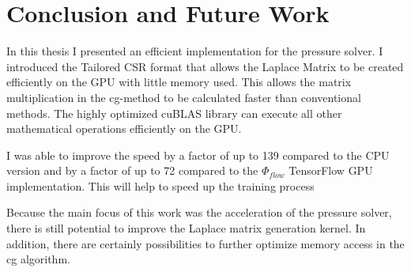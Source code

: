 
\chapter{Conclusion and Future Work}\label{chapter:conclusion}
In this thesis I presented an efficient implementation for the pressure solver. I introduced the Tailored CSR format that allows the Laplace Matrix to be created efficiently on the GPU with little memory used. This allows the matrix multiplication in the cg-method to be calculated faster than conventional methods. The highly optimized cuBLAS library can execute all other mathematical operations efficiently on the GPU.\\
\par I was able to improve the speed by a factor of up to 139 compared to the CPU version and by a factor of up to 72 compared to the $\Phi_{flow}$ TensorFlow GPU implementation. This will help to speed up the training process \\
\par Because the main focus of this work was the acceleration of the pressure solver, there is still potential to improve the Laplace matrix generation kernel. In addition, there are certainly possibilities to further optimize memory access in the cg algorithm. 
